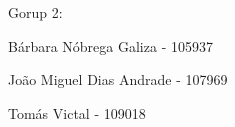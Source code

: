 Gorup 2\+:
\begin{DoxyItemize}
\item Bárbara Nóbrega Galiza -\/ 105937
\item João Miguel Dias Andrade -\/ 107969
\item Tomás Victal -\/ 109018 
\end{DoxyItemize}